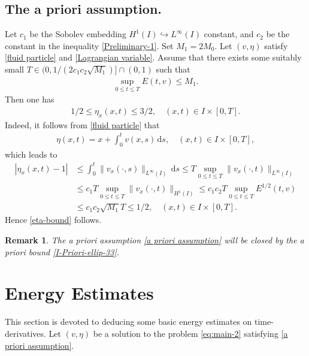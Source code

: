 \documentclass[11pt, reqno]{amsart}
\newcommand{\diff}{\mathrm{d}}
\newtheorem{remark}{Remark}
\numberwithin{equation}{section}
\begin{document}
\subsection{The a priori assumption.}\label{The a priori assumption} Let \(c_1\) be the Sobolev embedding \(H^1(I)\hookrightarrow L^\infty(I)\) constant, and \(c_2\) be the constant in the inequality \eqref{Preliminary-1}. Set \(M_1=2M_0\).
Let \((v,\eta)\) satisfy \eqref{fluid particle} and \eqref{Lagrangian variable}. Assume that there exists some suitably small \(T\in(0,1/(2c_1c_2\sqrt{M_1})]\cap (0,1)\) such that 
\begin{align}\label{a priori assumption}
	\sup_{0\leq t\leq T}E(t,v)\leq M_1.
\end{align}
Then one has 
\begin{align}\label{eta-bound}
	1/2\leq \eta_x(x,t)\leq 3/2, \quad (x,t)\in I\times [0,T].
\end{align}
Indeed, it follows from \eqref{fluid particle} that
\begin{align*}
	\eta(x,t)=x+\int_0^tv(x,s)\,\diff s,\quad (x,t)\in I\times [0,T],
\end{align*}
which leads to 
\begin{equation*}
\begin{aligned}
	|\eta_x(x,t)-1|&\leq\int_0^t\|v_x(\cdot,s)\|_{L^\infty(I)}\,\diff s\leq T\sup_{0\leq t\leq T}\|v_x(\cdot,t)\|_{L^\infty(I)}\\
	&\leq c_1T\sup_{0\leq t\leq T}\|v_x(\cdot,t)\|_{H^1(I)}\leq c_1c_2T\sup_{0\leq t\leq T}E^{1/2}(t,v)\\
	&\leq c_1c_2\sqrt{M_1}T\leq 1/2, \quad (x,t)\in I\times [0,T].
\end{aligned}
\end{equation*}
Hence \eqref{eta-bound} follows.\\  


\begin{remark}\label{determin M_1 and T} The a priori assumption \eqref{a priori assumption} will be closed by the a priori bound \eqref{I-Priori-ellip-33}.     
\end{remark}

\section{Energy Estimates}\label{Energy Estimates}

This section is devoted to deducing some basic energy estimates on time-derivatives. Let \((v,\eta)\) be a solution to the problem \eqref{eq:main-2} satisfying \eqref{a priori assumption}.\\
\end{document}
